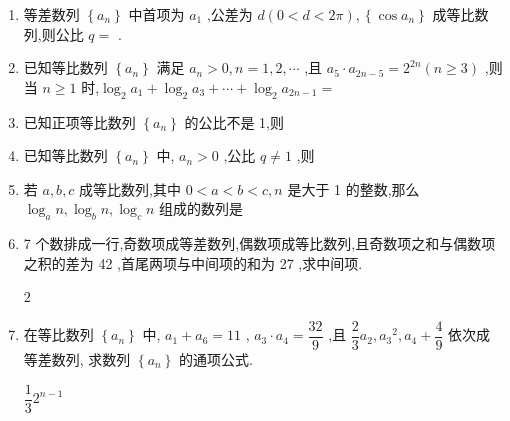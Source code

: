 \begin{enumerate}
    
    

    
    \item 等差数列 $\left\{  {a}_{n}\right\}$ 中首项为 ${a}_{1}$ ,公差为 $d\left( {0 < d < {2\pi }}\right) ,\left\{  {\cos {a}_{n}}\right\}$ 成等比数列,则公比 $q =$ .
    


    \item 已知等比数列 $\left\{  {a}_{n}\right\}$ 满足 ${a}_{n} > 0,n = 1,2,\cdots$ ,且 ${a}_{5} \cdot  {a}_{{2n} - 5} = {2}^{2n}\left( {n \geq  3}\right)$ ,则当 $n \geq  1$ 时,${\log }_{2}{a}_{1} + {\log }_{2}{a}_{3} + \cdots  + {\log }_{2}{a}_{{2n} - 1} =$      
    

    \item 已知正项等比数列 $\left\{  {a}_{n}\right\}$ 的公比不是 1,则      
    
    \item 已知等比数列 $\left\{  {a}_{n}\right\}$ 中, ${a}_{n} > 0$ ,公比 $q \neq  1$ ,则     
    
    \item 若 $a,b,c$ 成等比数列,其中 $0 < a < b < c,n$ 是大于 1 的整数,那么 ${\log }_{a}n,{\log }_{b}n,{\log }_{c}n$ 组成的数列是      
    
    \item 7 个数排成一行,奇数项成等差数列,偶数项成等比数列,且奇数项之和与偶数项之积的差为 42 ,首尾两项与中间项的和为 27 ,求中间项.
    \begin{jieda}
        $2$
    \end{jieda}
    
    \item 在等比数列 $\left\{  {a}_{n}\right\}$ 中, ${a}_{1} + {a}_{6} = {11}$ , ${a}_{3} \cdot  {a}_{4} = \dfrac{32}{9}$ ,且 $\dfrac{2}{3}{a}_{2},{a}_{3}{}^{2},{a}_{4} + \dfrac{4}{9}$ 依次成等差数列, 求数列 $\left\{  {a}_{n}\right\}$ 的通项公式.
    \begin{jieda}
        $\dfrac{1}{3}2^{n-1}$
    \end{jieda}
    
    
    \end{enumerate}


